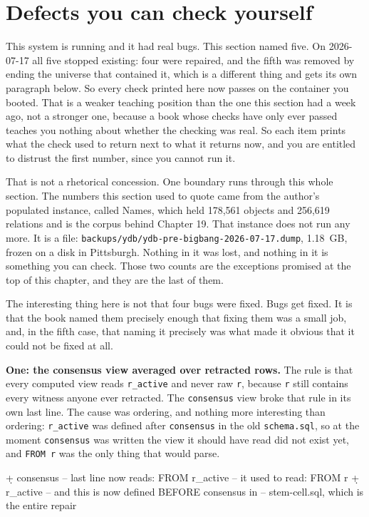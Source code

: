 \section{Defects you can check yourself}
\label{sec:defects}

This system is running and it had real bugs. This section named five. On 2026-07-17 all five stopped existing: four were repaired, and the fifth was removed by ending the universe that contained it, which is a different thing and gets its own paragraph below. So every check printed here now passes on the container you booted. That is a weaker teaching position than the one this section had a week ago, not a stronger one, because a book whose checks have only ever passed teaches you nothing about whether the checking was real. So each item prints what the check used to return next to what it returns now, and you are entitled to distrust the first number, since you cannot run it.

That is not a rhetorical concession. One boundary runs through this whole section. The numbers this section used to quote came from the author's populated instance, called Names, which held 178,561 objects and 256,619 relations and is the corpus behind Chapter 19. That instance does not run any more. It is a file: \texttt{backups/ydb/ydb-pre-bigbang-2026-07-17.dump}, 1.18~GB, frozen on a disk in Pittsburgh. Nothing in it was lost, and nothing in it is something you can check. Those two counts are the exceptions promised at the top of this chapter, and they are the last of them.

The interesting thing here is not that four bugs were fixed. Bugs get fixed. It is that the book named them precisely enough that fixing them was a small job, and, in the fifth case, that naming it precisely was what made it obvious that it could not be fixed at all.

\textbf{One: the consensus view averaged over retracted rows.} The rule is that every computed view reads \texttt{r\_active} and never raw \texttt{r}, because \texttt{r} still contains every witness anyone ever retracted. The \texttt{consensus} view broke that rule in its own last line. The cause was ordering, and nothing more interesting than ordering: \texttt{r\_active} was defined after \texttt{consensus} in the old \texttt{schema.sql}, so at the moment \texttt{consensus} was written the view it should have read did not exist yet, and \texttt{FROM r} was the only thing that would parse.

\begin{Check}
\d+ consensus            -- last line now reads: FROM r_active
                         -- it used to read:     FROM r
\d+ r_active             -- and this is now defined BEFORE consensus in
                         -- stem-cell.sql, which is the entire repair
\end{Check}

